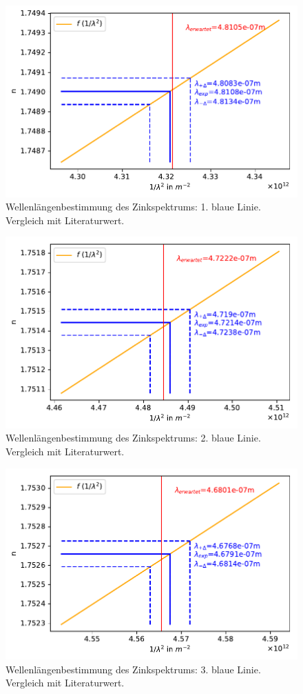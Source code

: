 \documentclass[12pt,a4paper]{article}
\begin{document}
\begin{figure}[H]
	\centering
	\includegraphics[width=0.7\linewidth]{Python/Zn_1.pdf}
	\caption{Wellenlängenbestimmung des Zinkspektrums: 1. blaue Linie. Vergleich mit Literaturwert.}
	\label{Zn_1}
\end{figure}
\begin{figure}[H]
	\centering
	\includegraphics[width=0.7\linewidth]{Python/Zn_2.pdf}
	\caption{Wellenlängenbestimmung des Zinkspektrums: 2. blaue Linie. Vergleich mit Literaturwert.}
	\label{Zn_2}
\end{figure}
\begin{figure}[H]
	\centering
	\includegraphics[width=0.7\linewidth]{Python/Zn_3.pdf}
	\caption{Wellenlängenbestimmung des Zinkspektrums: 3. blaue Linie. Vergleich mit Literaturwert.}
	\label{Zn_3}
\end{figure}
\end{document}
